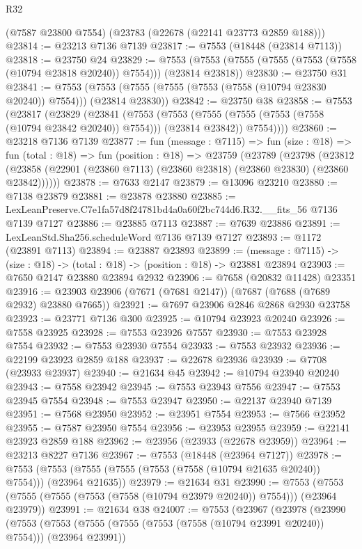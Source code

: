 \begin{lexlean}{R32}
\begin{coremodule}
    (@7587 @23800 @7554)
    (@23783 (@22678 (@22141 @23773 @2859 @188)))
@23814 := @23213 @7136 @7139
@23817 := @7553 (@18448 (@23814 @7113))
@23818 := @23750 @24
@23829 := @7553 (@7553 (@7555 (@7555 (@7553 (@7558 (@10794 @23818 @20240)) @7554))) (@23814 @23818))
@23830 := @23750 @31
@23841 := @7553 (@7553 (@7555 (@7555 (@7553 (@7558 (@10794 @23830 @20240)) @7554))) (@23814 @23830))
@23842 := @23750 @38
@23858 := @7553
    (@23817
      (@23829
        (@23841
          (@7553
            (@7553 (@7555 (@7555 (@7553 (@7558 (@10794 @23842 @20240)) @7554))) (@23814 @23842))
            @7554))))
@23860 := @23218 @7136 @7139
@23877 := fun (message : @7115) =>
  fun (size : @18) =>
  fun (total : @18) =>
  fun (position : @18) =>
  @23759
    (@23789
      (@23798
        (@23812 (@23858 (@22901 (@23860 @7113) (@23860 @23818) (@23860 @23830) (@23860 @23842))))))
@23878 := @7633 @2147
@23879 := @13096 @23210
@23880 := @7138 @23879
@23881 := @23878 @23880
@23885 := LexLeanPreserve.C7e1fa57d8f24781bd4a0a60f2bc744d6.R32.__fits_56 @7136 @7139 @7127
@23886 := @23885 @7113
@23887 := @7639 @23886
@23891 := LexLeanStd.Sha256.scheduleWord @7136 @7139 @7127
@23893 := @1172 (@23891 @7113)
@23894 := @23887 @23893
@23899 := (message : @7115) -> (size : @18) -> (total : @18) -> (position : @18) -> @23881 @23894
@23903 := @7650 @2147 @23880 @23894 @2932
@23906 := @7658 (@20832 @11428) @23351
@23916 := @23903 @23906 (@7671 (@7681 @2147)) (@7687 (@7688 (@7689 @2932) @23880 @7665))
@23921 := @7697 @23906 @2846 @2868 @2930 @23758
@23923 := @23771 @7136 @300
@23925 := @10794 @23923 @20240
@23926 := @7558 @23925
@23928 := @7553 @23926 @7557
@23930 := @7553 @23928 @7554
@23932 := @7553 @23930 @7554
@23933 := @7553 @23932
@23936 := @22199 @23923 @2859 @188
@23937 := @22678 @23936
@23939 := @7708 (@23933 @23937)
@23940 := @21634 @45
@23942 := @10794 @23940 @20240
@23943 := @7558 @23942
@23945 := @7553 @23943 @7556
@23947 := @7553 @23945 @7554
@23948 := @7553 @23947
@23950 := @22137 @23940 @7139
@23951 := @7568 @23950
@23952 := @23951 @7554
@23953 := @7566 @23952
@23955 := @7587 @23950 @7554
@23956 := @23953 @23955
@23959 := @22141 @23923 @2859 @188
@23962 := @23956 (@23933 (@22678 @23959))
@23964 := @23213 @8227 @7136
@23967 := @7553 (@18448 (@23964 @7127))
@23978 := @7553 (@7553 (@7555 (@7555 (@7553 (@7558 (@10794 @21635 @20240)) @7554))) (@23964 @21635))
@23979 := @21634 @31
@23990 := @7553 (@7553 (@7555 (@7555 (@7553 (@7558 (@10794 @23979 @20240)) @7554))) (@23964 @23979))
@23991 := @21634 @38
@24007 := @7553
    (@23967
      (@23978
        (@23990
          (@7553
            (@7553 (@7555 (@7555 (@7553 (@7558 (@10794 @23991 @20240)) @7554))) (@23964 @23991))

\end{coremodule}
\end{lexlean}
